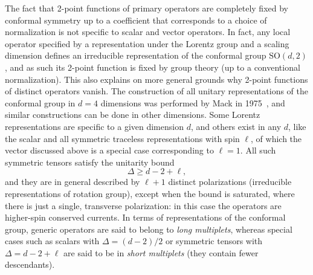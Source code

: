 \documentclass[a4paper,12pt]{article}
\newcommand{\SO}{\text{SO}}
\numberwithin{equation}{section}
\begin{document}
The fact that 2-point functions of primary operators are completely fixed by conformal symmetry up to a coefficient that corresponds to a choice of normalization is not specific to scalar and vector operators. In fact, any local operator specified by a representation under the Lorentz group and a scaling dimension defines an irreducible representation of the conformal group $\SO(d,2)$, and as such its 2-point function is fixed by group theory (up to a conventional normalization). This also explains on more general grounds why 2-point functions of distinct operators vanish.
The construction of all unitary representations of the conformal group in $d = 4$ dimensions was performed by Mack in 1975~\cite{Mack:1975je}, and similar constructions can be done in other dimensions. 
Some Lorentz representations are specific to a given dimension $d$, and others exist in any $d$, like the scalar and all symmetric traceless representations with spin $\ell$, of which the vector discussed above is a special case corresponding to $\ell = 1$. All such symmetric tensors satisfy the unitarity bound
\begin{equation}
	\Delta \geq d - 2 + \ell,
	\label{eq:unitaritybound:symmetricops}
\end{equation}
and they are in general described by $\ell + 1$ distinct polarizations (irreducible representations of rotation group), except when the bound is saturated, where there is just a single, transverse polarization: in this case the operators are higher-spin conserved currents.
In terms of representations of the conformal group, generic operators are said to belong to \emph{long multiplets}, whereas special cases such as scalars with $\Delta = (d-2)/2$ or symmetric tensors with $\Delta = d - 2 + \ell$ are said to be in \emph{short multiplets} (they contain fewer descendants). 

%
\end{document}
